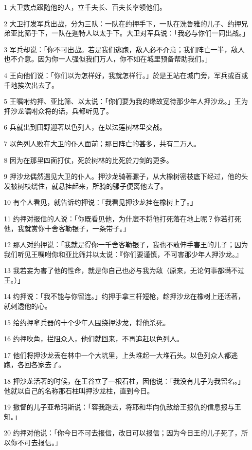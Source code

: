 \par 1 大卫数点跟随他的人，立千夫长、百夫长率领他们。
\par 2 大卫打发军兵出战，分为三队：一队在约押手下，一队在洗鲁雅的儿子、约押兄弟亚比筛手下，一队在迦特人以太手下。大卫对军兵说：「我必与你们一同出战。」
\par 3 军兵却说：「你不可出战。若是我们逃跑，敌人必不介意；我们阵亡一半，敌人也不介意。因为你一人强似我们万人，你不如在城里预备帮助我们。」
\par 4 王向他们说：「你们以为怎样好，我就怎样行。」於是王站在城门旁，军兵或百或千地挨次出去了。
\par 5 王嘱咐约押、亚比筛、以太说：「你们要为我的缘故宽待那少年人押沙龙。」王为押沙龙嘱咐众将的话，兵都听见了。
\par 6 兵就出到田野迎著以色列人，在以法莲树林里交战。
\par 7 以色列人败在大卫的仆人面前；那日阵亡的甚多，共有二万人。
\par 8 因为在那里四面打仗，死於树林的比死於刀剑的更多。
\par 9 押沙龙偶然遇见大卫的仆人。押沙龙骑著骡子，从大橡树密枝底下经过，他的头发被树枝绕住，就悬挂起来，所骑的骡子便离他去了。
\par 10 有个人看见，就告诉约押说：「我看见押沙龙挂在橡树上了。」
\par 11 约押对报信的人说：「你既看见他，为什麽不将他打死落在地上呢？你若打死他，我就赏你十舍客勒银子，一条带子。」
\par 12 那人对约押说：「我就是得你一千舍客勒银子，我也不敢伸手害王的儿子；因为我们听见王嘱咐你和亚比筛并以太说：『你们要谨慎，不可害那少年人押沙龙。』
\par 13 我若妄为害了他的性命，就是你自己也必与我为敌（原来，无论何事都瞒不过王。）」
\par 14 约押说：「我不能与你留连。」约押手拿三杆短枪，趁押沙龙在橡树上还活著，就刺透他的心。
\par 15 给约押拿兵器的十个少年人围绕押沙龙，将他杀死。
\par 16 约押吹角，拦阻众人，他们就回来，不再追赶以色列人。
\par 17 他们将押沙龙丢在林中一个大坑里，上头堆起一大堆石头。以色列众人都逃跑，各回各家去了。
\par 18 押沙龙活著的时候，在王谷立了一根石柱，因他说：「我没有儿子为我留名。」他就以自己的名称那石柱叫押沙龙柱，直到今日。
\par 19 撒督的儿子亚希玛斯说：「容我跑去，将耶和华向仇敌给王报仇的信息报与王知。」
\par 20 约押对他说：「你今日不可去报信，改日可以报信；因为今日王的儿子死了，所以你不可去报信。」
